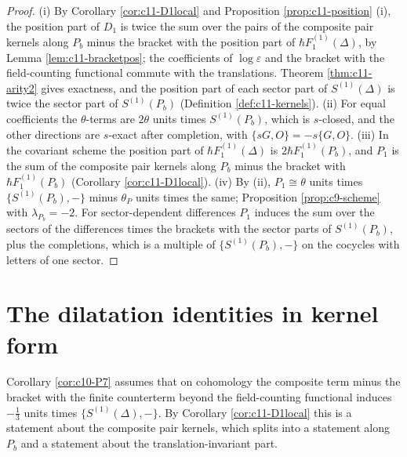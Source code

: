 \begin{corollary}
\begin{itemize}
\end{itemize}
\end{corollary}

\begin{proof}
(i) By Corollary \ref{cor:c11-D1local} and Proposition \ref{prop:c11-position} (i), the position part of $D_1$ is twice the sum over the pairs of the composite pair kernels along $P_b$ minus the bracket with the position part of $\hbar F_1^{(1)}(\Delta)$, by Lemma \ref{lem:c11-bracketpos}; the coefficients of $\log\varepsilon$ and the bracket with the field-counting functional commute with the translations. Theorem \ref{thm:c11-arity2} gives exactness, and the position part of each sector part of $S^{(1)}(\Delta)$ is twice the sector part of $S^{(1)}(P_b)$ (Definition \ref{def:c11-kernels}). (ii) For equal coefficients the $\theta$-terms are $2\theta$ units times $S^{(1)}(P_b)$, which is $s$-closed, and the other directions are $s$-exact after completion, with $\{sG,O\}=-s\{G,O\}$. (iii) In the covariant scheme the position part of $\hbar F_1^{(1)}(\Delta)$ is $2\hbar F_1^{(1)}(P_b)$, and $P_1$ is the sum of the composite pair kernels along $P_b$ minus the bracket with $\hbar F_1^{(1)}(P_b)$ (Corollary \ref{cor:c11-D1local}). (iv) By (ii), $P_1\cong\theta$ units times $\{S^{(1)}(P_b),-\}$ minus $\theta_P$ units times the same; Proposition \ref{prop:c9-scheme} with $\lambda_{P_b}=-2$. For sector-dependent differences $P_1$ induces the sum over the sectors of the differences times the brackets with the sector parts of $S^{(1)}(P_b)$, plus the completions, which is a multiple of $\{S^{(1)}(P_b),-\}$ on the cocycles with letters of one sector.
\end{proof}

\section{The dilatation identities in kernel form}

Corollary \ref{cor:c10-P7} assumes that on cohomology the composite term minus the bracket with the finite counterterm beyond the field-counting functional induces $-\tfrac13$ units times $\{S^{(1)}(\Delta),-\}$. By Corollary \ref{cor:c11-D1local} this is a statement about the composite pair kernels, which splits into a statement along $P_b$ and a statement about the translation-invariant part.

